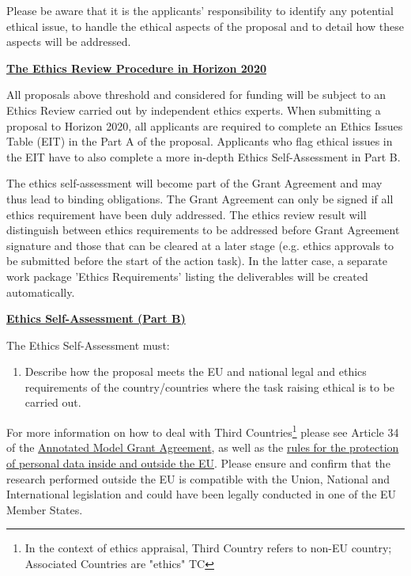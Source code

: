 \medskip\noindent
Please be aware that it is the applicants' responsibility to identify any potential ethical issue, 
to handle the ethical aspects of the proposal and to detail how these aspects will be addressed.

\bigskip\noindent
{\large {\bf \ul{The Ethics Review Procedure in Horizon 2020}}}

\medskip\noindent
All proposals above threshold and considered for funding will be subject to an Ethics Review carried out by independent ethics experts. 
When submitting a proposal to Horizon 2020, all applicants are required to complete an Ethics Issues Table (EIT) in the Part A of the proposal. 
Applicants who flag ethical issues in the EIT have to also complete a more in-depth Ethics Self-Assessment in Part B.

\medskip\noindent
The ethics self-assessment will become part of the Grant Agreement and may thus lead to
binding obligations. The Grant Agreement can only be signed if all ethics requirement
have been duly addressed. The ethics review result will distinguish between ethics
requirements to be addressed before Grant Agreement signature and those that can be
cleared at a later stage (e.g. ethics approvals to be submitted before the start of the action
task). In the latter case, a separate work package 'Ethics Requirements' listing the
deliverables will be created automatically.

\medskip\noindent
\setlength{\fboxsep}{1mm}

\bigskip\noindent
{\large {\bf \ul{Ethics Self-Assessment (Part B)}}}

\medskip\noindent
The Ethics Self-Assessment must:

{\bf
\begin{enumerate}[leftmargin=*, label=\arabic*)]
  \item Describe how the proposal meets the EU and national legal and ethics requirements of the country/countries where the task raising ethical is to be carried out.
\end{enumerate}
}

\medskip\noindent
For more information on how to deal with Third Countries\footnote{In the context of ethics
appraisal, Third Country refers to non-EU country; Associated Countries are "ethics"
TC} please see Article 34 of the
\href{http://ec.europa.eu/research/participants/data/ref/h2020/grants_manual/amga/h2020-amga_en.pdf}{Annotated Model Grant Agreement},
as well as the
\href{http://ec.europa.eu/justice/data-protection/international-transfers/adequacy/index_en.htm}{rules for the protection of personal data inside and outside the EU}.
Please ensure and confirm that the research performed outside the EU
is compatible with the Union, National and International legislation and could have
been legally conducted in one of the EU Member States.

